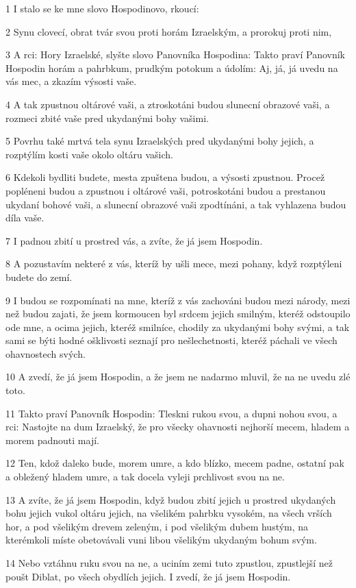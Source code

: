 \par 1 I stalo se ke mne slovo Hospodinovo, rkoucí:
\par 2 Synu clovecí, obrat tvár svou proti horám Izraelským, a prorokuj proti nim,
\par 3 A rci: Hory Izraelské, slyšte slovo Panovníka Hospodina: Takto praví Panovník Hospodin horám a pahrbkum, prudkým potokum a údolím: Aj, já, já uvedu na vás mec, a zkazím výsosti vaše.
\par 4 A tak zpustnou oltárové vaši, a ztroskotáni budou slunecní obrazové vaši, a rozmeci zbité vaše pred ukydanými bohy vašimi.
\par 5 Povrhu také mrtvá tela synu Izraelských pred ukydanými bohy jejich, a rozptýlím kosti vaše okolo oltáru vašich.
\par 6 Kdekoli bydliti budete, mesta zpuštena budou, a výsosti zpustnou. Procež popléneni budou a zpustnou i oltárové vaši, potroskotáni budou a prestanou ukydaní bohové vaši, a slunecní obrazové vaši zpodtínáni, a tak vyhlazena budou díla vaše.
\par 7 I padnou zbití u prostred vás, a zvíte, že já jsem Hospodin.
\par 8 A pozustavím nekteré z vás, kteríž by ušli mece, mezi pohany, když rozptýleni budete do zemí.
\par 9 I budou se rozpomínati na mne, kteríž z vás zachováni budou mezi národy, mezi než budou zajati, že jsem kormoucen byl srdcem jejich smilným, kteréž odstoupilo ode mne, a ocima jejich, kteréž smilníce, chodily za ukydanými bohy svými, a tak sami se býti hodné ošklivosti seznají pro nešlechetnosti, kteréž páchali ve všech ohavnostech svých.
\par 10 A zvedí, že já jsem Hospodin, a že jsem ne nadarmo mluvil, že na ne uvedu zlé toto.
\par 11 Takto praví Panovník Hospodin: Tleskni rukou svou, a dupni nohou svou, a rci: Nastojte na dum Izraelský, že pro všecky ohavnosti nejhorší mecem, hladem a morem padnouti mají.
\par 12 Ten, kdož daleko bude, morem umre, a kdo blízko, mecem padne, ostatní pak a obležený hladem umre, a tak docela vyleji prchlivost svou na ne.
\par 13 A zvíte, že já jsem Hospodin, když budou zbití jejich u prostred ukydaných bohu jejich vukol oltáru jejich, na všelikém pahrbku vysokém, na všech vrších hor, a pod všelikým drevem zeleným, i pod všelikým dubem hustým, na kterémkoli míste obetovávali vuni libou všelikým ukydaným bohum svým.
\par 14 Nebo vztáhnu ruku svou na ne, a uciním zemi tuto zpustlou, zpustlejší než poušt Diblat, po všech obydlích jejich. I zvedí, že já jsem Hospodin.

